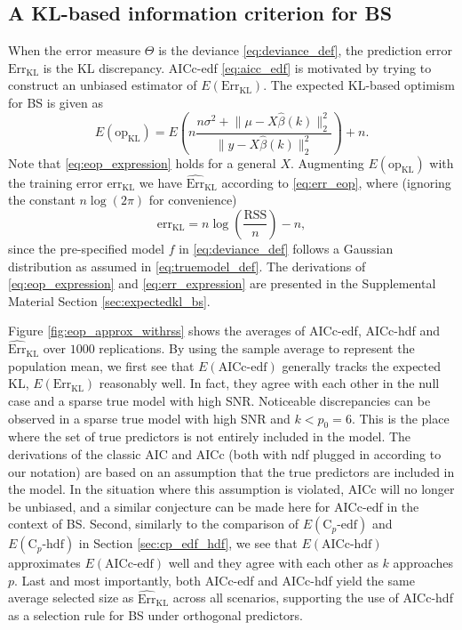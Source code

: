 \subsection{A KL-based information criterion for BS}
When the error measure $\Theta$ is the deviance \eqref{eq:deviance_def}, the prediction error $\text{Err}_\text{KL}$ is the KL discrepancy. AICc-edf \eqref{eq:aicc_edf} is motivated by trying to construct an unbiased estimator of $E(\text{Err}_\text{KL})$. The expected KL-based optimism for BS is given as
\begin{equation}
E(\text{op}_\text{KL}) = E\left(n \frac{n\sigma^2+\lVert \mu-X\hat{\beta}(k) \rVert_2^2}{\lVert y-X\hat{\beta}(k)\rVert_2^2}\right) + n.
\label{eq:eop_expression}
\end{equation}
Note that \eqref{eq:eop_expression} holds for a general $X$. Augmenting $E(\text{op}_\text{KL})$ with the training error $\text{err}_{\text{KL}}$ we have $\widehat{\text{Err}}_{\text{KL}}$ according to \eqref{eq:err_eop}, where (ignoring the constant $n\log(2\pi)$ for convenience)
\begin{equation}
\text{err}_{\text{KL}} = n\log\left(\frac{\text{RSS}}{n}\right) - n,
\label{eq:err_expression}
\end{equation}
since the pre-specified model $f$ in \eqref{eq:deviance_def} follows a Gaussian distribution as assumed in \eqref{eq:truemodel_def}. The derivations of \eqref{eq:eop_expression} and \eqref{eq:err_expression} are presented in the Supplemental Material Section \ref{sec:expectedkl_bs}. 

Figure \ref{fig:eop_approx_withrss} shows the averages of AICc-edf, AICc-hdf and $\widehat{\text{Err}}_{\text{KL}}$ over $1000$ replications. By using the sample average to represent the population mean, we first see that $E(\text{AICc-edf})$ generally tracks the expected KL, $E(\text{Err}_{\text{KL}})$ reasonably well. In fact, they agree with each other in the null case and a sparse true model with high SNR. Noticeable discrepancies can be observed in a sparse true model with high SNR and $k<p_0=6$. This is the place where the set of true predictors is not entirely included in the model. The derivations of the classic AIC and AICc (both with ndf plugged in according to our notation) are based on an assumption that the true predictors are included in the model. In the situation where this assumption is violated, AICc will no longer be unbiased, and a similar conjecture can be made here for AICc-edf in the context of BS. Second, similarly to the comparison of $E(\text{C}_p\text{-edf})$ and $E(\text{C}_p\text{-hdf})$ in Section \ref{sec:cp_edf_hdf}, we see that $E(\text{AICc-hdf})$ approximates $E(\text{AICc-edf})$ well and they agree with each other as $k$ approaches $p$. 
Last and most importantly, both AICc-edf and AICc-hdf yield the same average selected size as $\widehat{\text{Err}}_{\text{KL}}$ across all scenarios, supporting the use of AICc-hdf as a selection rule for BS under orthogonal predictors.

